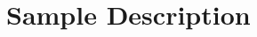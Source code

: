 \documentclass[fleqn,usenatbib,useAMS]{mnras}
\begin{document}


\section{Sample Description}
	\label{sec:samp}

\end{document}
